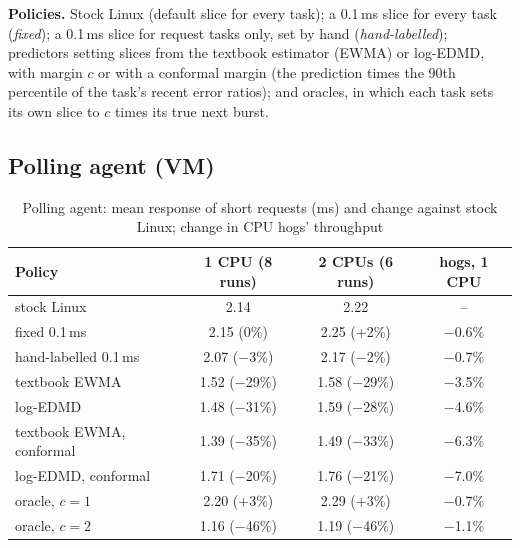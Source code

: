 \documentclass[conference,onecolumn,11pt]{IEEEtran}
\begin{document}
\textbf{Policies.} Stock Linux (default slice for every task); a 0.1\,ms slice for every task (\emph{fixed}); a 0.1\,ms slice for request tasks only, set by hand (\emph{hand-labelled}); predictors setting slices from the textbook estimator (EWMA) or log-EDMD, with margin $c$ or with a conformal margin (the prediction times the 90th percentile of the task's recent error ratios); and oracles, in which each task sets its own slice to $c$ times its true next burst.

\subsection{Polling agent (VM)}\label{sec:poll}
\begin{table}[t]
\centering
\caption{Polling agent: mean response of short requests (ms) and change against stock Linux; change in CPU hogs' throughput}\label{tab:poll}
\begin{tabular}{@{}lccc@{}}
\toprule
Policy & 1 CPU (8 runs) & 2 CPUs (6 runs) & hogs, 1 CPU \\
\midrule
stock Linux & 2.14 & 2.22 & -- \\
fixed 0.1\,ms & 2.15 (0\%) & 2.25 (+2\%) & $-$0.6\% \\
hand-labelled 0.1\,ms & 2.07 ($-$3\%) & 2.17 ($-$2\%) & $-$0.7\% \\
textbook EWMA & 1.52 ($-$29\%) & 1.58 ($-$29\%) & $-$3.5\% \\
log-EDMD & 1.48 ($-$31\%) & 1.59 ($-$28\%) & $-$4.6\% \\
textbook EWMA, conformal & 1.39 ($-$35\%) & 1.49 ($-$33\%) & $-$6.3\% \\
log-EDMD, conformal & 1.71 ($-$20\%) & 1.76 ($-$21\%) & $-$7.0\% \\
oracle, $c=1$ & 2.20 (+3\%) & 2.29 (+3\%) & $-$0.7\% \\
oracle, $c=2$ & 1.16 ($-$46\%) & 1.19 ($-$46\%) & $-$1.1\% \\
\bottomrule
\end{tabular}
\end{table}
\end{document}

